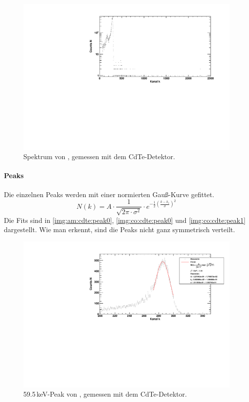 \begin{figure}[H]
\begin{center}
  \includegraphics[width=\textwidth]{../img/part3/Am-CdTe_spectrum.pdf}
  \caption{Spektrum von \am, gemessen mit dem CdTe-Detektor.}
  \label{img:cdte:am:spektrum}
\end{center}
\end{figure}


\paragraph{Peaks}
Die einzelnen Peaks werden mit einer normierten Gauß-Kurve gefittet.
\begin{equation}
  \label{eq:part3:normgauss}
  N(k) = A \cdot \frac{1}{\sqrt{2\pi \cdot \sigma^2}} \cdot e^{-\frac{1}{2} \left( \frac{k-k_c}{\sigma} \right)^2}
\end{equation}
Die Fits sind in \autoref{img:am:cdte:peak0}, \autoref{img:co:cdte:peak0} und \autoref{img:co:cdte:peak1} dargestellt. Wie man erkennt, sind die 
Peaks nicht ganz symmetrisch verteilt. %
\begin{figure}[H]
\begin{center}
  \includegraphics[width=\textwidth]{../img/part3/Am-CdTe_00.pdf}
  \caption{59.5\,keV-Peak von \am, gemessen mit dem CdTe-Detektor.}
  \label{img:am:cdte:peak0}
\end{center}
\end{figure}

